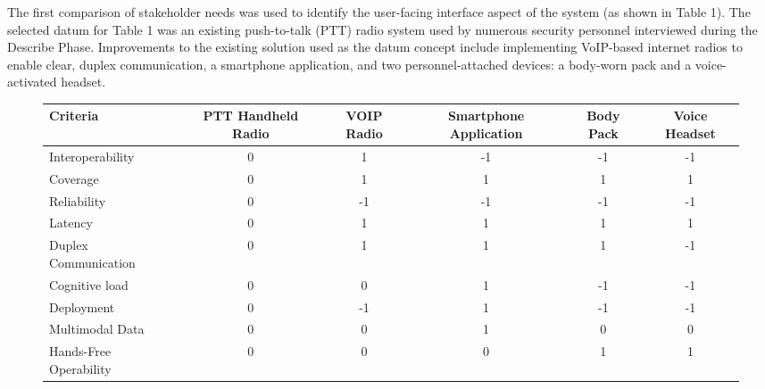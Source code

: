 \documentclass[english,12pt,a4paper,titlepage]{article}
\begin{document}
	The first comparison of stakeholder needs was used to identify the user-facing interface aspect of the system (as shown in Table 1). The selected datum for Table 1 was an existing push-to-talk (PTT) radio system used by numerous security personnel interviewed during the Describe Phase. Improvements to the existing solution used as the datum concept include implementing VoIP-based internet radios to enable clear, duplex communication, a smartphone application, and two personnel-attached devices: a body-worn pack and a voice-activated headset. 
	\begin{figure}[H]
		\begin{minipage}{\textwidth}
			\centering
			\label{Select Phase - User Interface Pugh Chart}
		\end{minipage}
		\centering
		\begin{adjustbox}{max width=\textwidth}
			\begin{tabular}{l c c c c c}
				\toprule
				\textbf{Criteria} & \textbf{PTT Handheld Radio} & \textbf{VOIP Radio} & \textbf{Smartphone Application} & \textbf{Body Pack} & \textbf{Voice Headset} \\
				\midrule
				Interoperability & 0 & \cellcolor{green!25}1 & \cellcolor{red!25}-1 & \cellcolor{red!25}-1 & \cellcolor{red!25}-1 \\
				Coverage & 0 & \cellcolor{green!25}1 & \cellcolor{green!25}1 & \cellcolor{green!25}1 & \cellcolor{green!25}1 \\
				Reliability & 0 & \cellcolor{red!25}-1 & \cellcolor{red!25}-1 & \cellcolor{red!25}-1 & \cellcolor{red!25}-1 \\
				Latency & 0 & \cellcolor{green!25}1 & \cellcolor{green!25}1 & \cellcolor{green!25}1 & \cellcolor{green!25}1 \\
				Duplex Communication & 0 & \cellcolor{green!25}1 & \cellcolor{green!25}1 & \cellcolor{green!25}1 & \cellcolor{red!25}-1 \\
				Cognitive load & 0 & 0 & \cellcolor{green!25}1 & \cellcolor{red!25}-1 & \cellcolor{red!25}-1 \\
				Deployment & 0 & \cellcolor{red!25}-1 & \cellcolor{green!25}1 & \cellcolor{red!25}-1 & \cellcolor{red!25}-1 \\
				Multimodal Data & 0 & 0 & \cellcolor{green!25}1 & 0 & 0 \\
				Hands-Free Operability & 0 & 0 & 0 & \cellcolor{green!25}1 & \cellcolor{green!25}1 \\

\end{tabular}
\end{adjustbox}
\end{figure}
\end{document}
